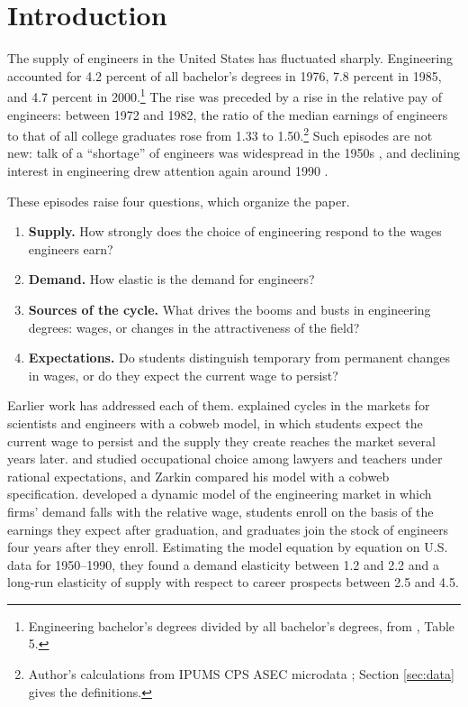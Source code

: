 \documentclass[12pt]{article}
\begin{document}
\newpage
{} %

\section{Introduction}\label{sec:intro}

The supply of engineers in the United States has fluctuated sharply. Engineering accounted for 4.2 percent of all bachelor's degrees in 1976, 7.8 percent in 1985, and 4.7 percent in 2000.\footnote{Engineering bachelor's degrees divided by all bachelor's degrees, from \citet{nsf13327}, Table 5.} The rise was preceded by a rise in the relative pay of engineers: between 1972 and 1982, the ratio of the median earnings of engineers to that of all college graduates rose from 1.33 to 1.50.\footnote{Author's calculations from IPUMS CPS ASEC microdata \citep{ipumscps}; Section \ref{sec:data} gives the definitions.} Such episodes are not new: talk of a ``shortage'' of engineers was widespread in the 1950s \citep{arrow1959dynamic}, and declining interest in engineering drew attention again around 1990 \citep{ryoo2004engineering}.

These episodes raise four questions, which organize the paper.
\begin{enumerate}\itemsep0pt
\item \textbf{Supply.} How strongly does the choice of engineering respond to the wages engineers earn?
\item \textbf{Demand.} How elastic is the demand for engineers?
\item \textbf{Sources of the cycle.} What drives the booms and busts in engineering degrees: wages, or changes in the attractiveness of the field?
\item \textbf{Expectations.} Do students distinguish temporary from permanent changes in wages, or do they expect the current wage to persist?
\end{enumerate}

Earlier work has addressed each of them. \citet{freeman1971market,freeman1975supply,freeman1976cobweb} explained cycles in the markets for scientists and engineers with a cobweb model, in which students expect the current wage to persist and the supply they create reaches the market several years later. \citet{siow1984occupational} and \citet{zarkin1985occupational} studied occupational choice among lawyers and teachers under rational expectations, and Zarkin compared his model with a cobweb specification. \citet{ryoo2004engineering} developed a dynamic model of the engineering market in which firms' demand falls with the relative wage, students enroll on the basis of the earnings they expect after graduation, and graduates join the stock of engineers four years after they enroll. Estimating the model equation by equation on U.S. data for 1950--1990, they found a demand elasticity between 1.2 and 2.2 and a long-run elasticity of supply with respect to career prospects between 2.5 and 4.5.
\end{document}
